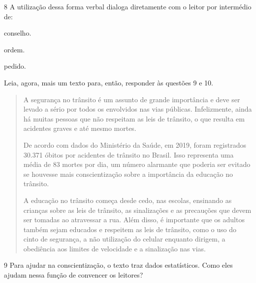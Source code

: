 \num{8} A utilização dessa forma verbal dialoga diretamente com o leitor por
intermédio de:

\begin{boxlist}
 conselho.

 ordem.

 pedido.
\end{boxlist}

Leia, agora, mais um texto para, então, responder às questões 9 e 10.


\begin{quote}
A segurança no trânsito é um assunto de grande importância e deve ser
levado a sério por todos os envolvidos nas vias públicas. Infelizmente,
ainda há muitas pessoas que não respeitam as leis de trânsito, o que
resulta em acidentes graves e até mesmo mortes.


De acordo com dados do Ministério da Saúde, em 2019, foram registrados
30.371 óbitos por acidentes de trânsito no Brasil. Isso representa uma
média de 83 mortes por dia, um número alarmante que poderia ser evitado
se houvesse mais conscientização sobre a importância da educação no
trânsito.


A educação no trânsito começa desde cedo, nas escolas, ensinando as
crianças sobre as leis de trânsito, as sinalizações e as precauções que
devem ser tomadas ao atravessar a rua. Além disso, é importante que os
adultos também sejam educados e respeitem as leis de trânsito, como o
uso do cinto de segurança, a não utilização do celular enquanto dirigem,
a obediência aos limites de velocidade e a sinalização nas vias.

\end{quote}


\pagebreak
\num{9} Para ajudar na conscientização, o texto traz dados estatísticos. Como
eles ajudam nessa função de convencer os leitores?



